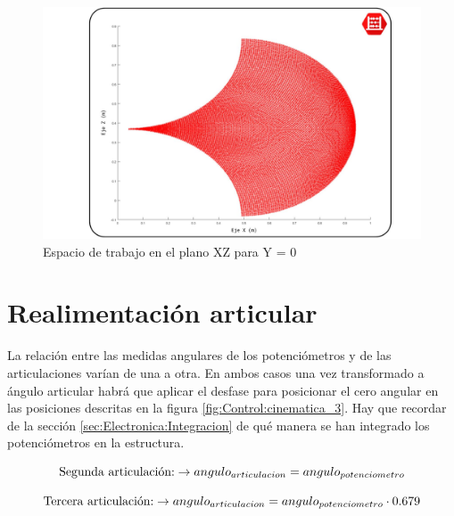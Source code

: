 	 \begin{figure}[H]
	 	\centering
	 	\includegraphics[width=\textwidth]{figuras/Imagenes_cinematica/workspace_robot.jpg}
	 	\caption{Espacio de trabajo en el plano XZ para Y = 0}
	 	\label{fig:cinematica:espacioTrabajo}
	 \end{figure}
\section{Realimentación articular}

	La relación entre las medidas angulares de los potenciómetros y de las articulaciones varían de una a otra. En ambos casos una vez transformado a ángulo articular habrá que aplicar el desfase para posicionar el cero angular en las posiciones descritas en la figura \ref{fig:Control:cinematica_3}. Hay que recordar de la sección \ref{sec:Electronica:Integracion} de qué manera se han integrado los potenciómetros en la estructura.
	
	   \begin{equation}
		   \textnormal{Segunda articulación:} \to	angulo_{articulacion} = angulo_{potenciometro} 
	   \end{equation}
	   
	   \begin{equation}
		   \textnormal{Tercera articulación:} \to	   angulo_{articulacion} = angulo_{potenciometro} \cdot 0.679
	   \end{equation}